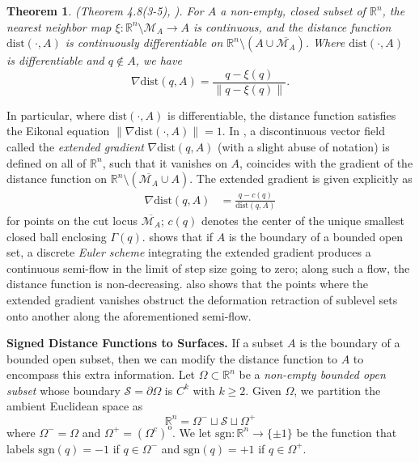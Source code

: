 \documentclass[11pt]{article}
\newcommand{\R}{\mathbb{R}}
\newcommand{\sgn}{\mathrm{sgn}}
\newcommand{\cutlocus}[1]{\overline{\mathcal{M}_{#1}}}
\newcommand{\W}{\Omega}
\newcommand{\bord}{\partial}
\newcommand{\union}{\cup}
\newcommand{\dist}{\mathrm{dist}}
\newcommand{\Surf}{\mathcal{S}}
\theoremstyle{plain}
\newtheorem{thm}{Theorem}
\theoremstyle{definition}
\theoremstyle{remark}
\begin{document}
	\begin{thm} \emph{(Theorem 4.8(3-5), {\cite{federer1959curvature}})}.
		For $A$ a non-empty, closed subset of $\R^n$, the nearest neighbor map $\xi: \R^n \setminus \mathcal{M}_{A} \to A$ is continuous, and the distance function $\dist(\cdot, A)$ is continuously differentiable on $ \R^n \setminus (A \union \cutlocus{A})$. Where $\dist(\cdot, A)$ is differentiable and $q \notin A$, we have
		\begin{equation}
			\nabla \dist(q, A) = \frac{q - \xi(q)}{\| q - \xi(q) \|}.\label{eq:classic_grad_dist}
		\end{equation}
	\end{thm}
	In particular, where $\dist(\cdot, A)$ is differentiable, the distance function satisfies the Eikonal equation $\| \nabla \dist(\cdot, A) \| = 1$. In \cite{lieutier_any_2003}, a discontinuous vector field called the \emph{extended gradient} $\nabla \dist(q,A)$ (with a slight abuse of notation) is defined on all of $\R^n$, such that it vanishes on $A$, coincides with the gradient of the distance function on $\R^n \setminus (\cutlocus{A} \cup A)$. The extended gradient is given explicitly as 
	\begin{align}\label{eq:extend_grad_dist}
		\nabla \dist(q,A) &= \frac{q - c(q)}{\dist(q,A)}
	\end{align}
	for points on the cut locus $\cutlocus{A}$; $c(q)$ denotes the center of the unique smallest closed ball enclosing $\Gamma(q)$. \cite{lieutier_any_2003} shows that if $A$ is the boundary of a bounded open set, a discrete \emph{Euler scheme} integrating the extended gradient produces a continuous semi-flow in the limit of step size going to zero; along such a flow, the distance function is non-decreasing. \cite{lieutier_any_2003} also shows that the points where the extended gradient vanishes obstruct the deformation retraction of sublevel sets onto another along the aforementioned semi-flow. 
	
	
	\textbf{Signed Distance Functions to Surfaces.}
	\label{sec:properties_signed_dist}
	If a subset $A$ is the boundary of a bounded open subset, then we can modify the distance function to $A$ to encompass this extra information. Let $\W \subset \R^n$ be a \textit{non-empty bounded open subset} whose boundary  $\Surf = \bord \W$ is $C^k$ with $k \geq 2$. Given $\W$, we partition the ambient Euclidean space as
	\begin{equation} \label{eq:partition}
		\R^n = \W^- \sqcup \Surf \sqcup \W^+
	\end{equation}
	where $\W^- = \W$ and $\W^+ = (\W^\mathrm{c})^\mathrm{o}$. We let $\sgn: \R^n \to \{\pm 1\}$ be the function that labels $\sgn(q) = - 1$ if $q \in \W^-$ and $\sgn(q) = +1$ if $q \in \W^+$. 
	
\end{document}
